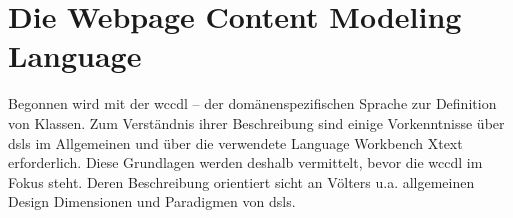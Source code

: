 \section{Die Webpage Content Modeling Language}
    \label{section:solutionDetailsDSL}
    Begonnen wird mit der \gls{wccdl} --
    der domänenspezifischen Sprache zur Definition von Klassen.
    Zum Verständnis ihrer Beschreibung sind einige Vorkenntnisse über \glspl{dsl} im Allgemeinen
    und über die verwendete Language Workbench Xtext erforderlich.
    Diese Grundlagen werden deshalb vermittelt,
    bevor die \gls{wccdl} im Fokus steht.
    Deren Beschreibung orientiert sicht an Völters u.a.
    \cite{voelter:DslEngineering}
    allgemeinen Design Dimensionen und Paradigmen von \glspl{dsl}.

    
    
    
    
    
    
    
    
    
